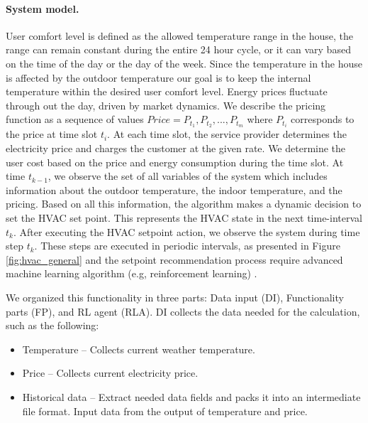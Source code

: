 \paragraph*{System model.}
User comfort level is defined as the allowed temperature range in the house, the range can remain constant during the entire 24 hour cycle, or it can vary based on the time of the day or the day of the week. Since the temperature in the house is affected by the outdoor temperature our goal is to keep the internal temperature within the desired user comfort level. 
Energy prices fluctuate through out the day, driven by market dynamics. We describe the pricing function as a sequence of values $Price = {P_{t_1}, P_{t_2}, . . . , P_{t_m}}$ where $P_{t_i}$ corresponds to the price at time slot ${t_i}$. At each time slot, the service provider determines the electricity price and charges the customer at the given rate. We determine the user cost based on the price and energy consumption during the time slot. At time $t_{k-1}$, we observe the set of all variables of the system which includes information about the outdoor temperature, the indoor temperature, and the pricing. Based on all this information, the  algorithm makes a dynamic decision to set the HVAC set point. This represents the HVAC state in the next time-interval $t_k$. After executing the HVAC setpoint action, we observe the system during time step $t_k$. These steps are executed in periodic intervals, as presented in Figure \ref{fig:hvac_general} and the setpoint recommendation process require advanced machine learning algorithm (e.g, reinforcement learning) \cite{kotevska2020rl}. %


We organized this functionality in three parts: Data input (DI), Functionality parts (FP), and RL agent (RLA). DI collects the data needed for the calculation, such as the following: %
\begin{itemize}
    \item Temperature -- Collects current weather temperature.
    \item Price -- Collects current electricity price.
    \item Historical data -- Extract needed data fields and packs it into an intermediate file format. Input data from the output of temperature and price.
\end{itemize}

